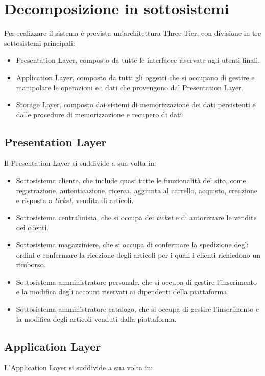 \documentclass[12pt,a4paper]{article}
\begin{document}

\section{Decomposizione in sottosistemi}
Per realizzare il sistema è prevista un'architettura Three-Tier, con divisione in tre sottosistemi principali:
\begin{itemize}
\item Presentation Layer, composto da tutte le interfacce riservate agli utenti finali.
\item Application Layer, composto da tutti gli oggetti che si occupano di gestire e manipolare le operazioni e i dati che provengono dal Presentation Layer.
\item Storage Layer, composto dai sistemi di memorizzazione dei dati persistenti e dalle procedure di memorizzazione e recupero di dati. 
\end{itemize}

\subsection{Presentation Layer}
Il Presentation Layer si suddivide a sua volta in:

\begin{itemize}
\item Sottosistema cliente, che include quasi tutte le funzionalità del sito, come registrazione, autenticazione, ricerca, aggiunta al carrello, acquisto, creazione e risposta a \emph{ticket}, vendita di articoli.
\item Sottosistema centralinista, che si occupa dei \emph{ticket} e di autorizzare le vendite dei clienti.
\item Sottosistema magazziniere, che si occupa di confermare la spedizione degli ordini e confermare la ricezione degli articoli per i quali i clienti richiedono un rimborso.
\item Sottosistema amministratore personale, che si occupa di gestire l'inserimento e la modifica degli account riservati ai dipendenti della piattaforma.
\item Sottosistema amministratore catalogo, che si occupa di gestire l'inserimento e la modifica degli articoli venduti dalla piattaforma.
\end{itemize}

\subsection{Application Layer}
L'Application Layer si suddivide a sua volta in:
\end{document}
